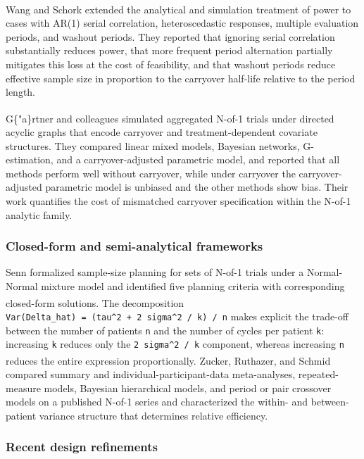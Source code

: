 \documentclass[
  11pt,
]{article}
\begin{document}
Wang and
Schork\textsuperscript{}
extended the analytical and simulation treatment of power to cases with
AR(1) serial correlation, heteroscedastic responses, multiple evaluation
periods, and washout periods. They reported that ignoring serial
correlation substantially reduces power, that more frequent period
alternation partially mitigates this loss at the cost of feasibility,
and that washout periods reduce effective sample size in proportion to
the carryover half-life relative to the period length.

G\{"a\}rtner and
colleagues\textsuperscript{}
simulated aggregated N-of-1 trials under directed acyclic graphs that
encode carryover and treatment-dependent covariate structures. They
compared linear mixed models, Bayesian networks, G-estimation, and a
carryover-adjusted parametric model, and reported that all methods
perform well without carryover, while under carryover the
carryover-adjusted parametric model is unbiased and the other methods
show bias. Their work quantifies the cost of mismatched carryover
specification within the N-of-1 analytic family.

\subsubsection{Closed-form and semi-analytical
frameworks}\label{closed-form-and-semi-analytical-frameworks}

Senn formalized sample-size planning for sets of N-of-1 trials under a
Normal-Normal mixture model and identified five planning criteria with
corresponding closed-form
solutions\textsuperscript{}.
The decomposition
\texttt{Var(Delta\_hat)\ =\ (tau\^{}2\ +\ 2\ sigma\^{}2\ /\ k)\ /\ n}
makes explicit the trade-off between the number of patients \texttt{n}
and the number of cycles per patient \texttt{k}: increasing \texttt{k}
reduces only the \texttt{2\ sigma\^{}2\ /\ k} component, whereas
increasing \texttt{n} reduces the entire expression proportionally.
Zucker, Ruthazer, and
Schmid\textsuperscript{}
compared summary and individual-participant-data meta-analyses,
repeated-measure models, Bayesian hierarchical models, and period or
pair crossover models on a published N-of-1 series and characterized the
within- and between-patient variance structure that determines relative
efficiency.

\subsubsection{Recent design
refinements}\label{recent-design-refinements}
\end{document}
